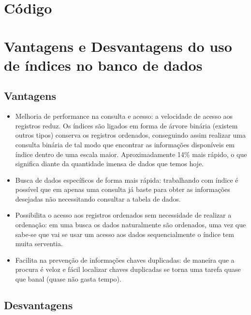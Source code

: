 \documentclass[12pt,a4paper]{article}
\begin{document}
\section{Código}

\section{Vantagens e Desvantagens do uso de índices no banco de dados}
\subsection{Vantagens}

\begin{itemize}
	\item Melhoria de performance na consulta e acesso: a velocidade de acesso aos registros reduz. Os índices são ligados em forma de árvore binária (existem outros tipos) conserva os registros ordenados, conseguindo assim realizar uma consulta binária de tal modo que encontrar as informações disponíveis em índice dentro de uma escala maior. Aproximadamente 14\% mais rápido, o que significa diante da quantidade imensa de dados que temos hoje.
	
	\item Busca de dados específicos de forma mais rápida: trabalhando com índice é possível que em apenas uma consulta já baste para obter as informações desejadas não necessitando consultar a tabela de dados.
	
	\item Possibilita o acesso aos registros ordenados sem necessidade de realizar a ordenação: em uma busca os dados naturalmente são ordenados, uma vez que sabe-se que vai se usar um acesso aos dados sequencialmente o índice tem muita serventia.
	
	\item Facilita na prevenção de informações chaves duplicadas: de maneira que a procura é veloz e fácil localizar chaves duplicadas se torna uma tarefa quase que banal (quase não gasta tempo).	
	
\end{itemize}

\subsection{Desvantagens}
\end{document}
